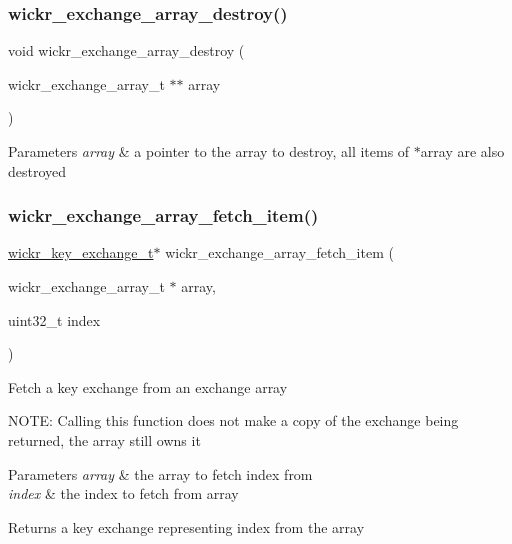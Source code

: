 \subsubsection{\texorpdfstring{wickr\+\_\+exchange\+\_\+array\+\_\+destroy()}{wickr\_exchange\_array\_destroy()}}
{\footnotesize\ttfamily void wickr\+\_\+exchange\+\_\+array\+\_\+destroy (\begin{DoxyParamCaption}\item[{wickr\+\_\+exchange\+\_\+array\+\_\+t $\ast$$\ast$}]{array }\end{DoxyParamCaption})}


\begin{DoxyParams}{Parameters}
{\em array} & a pointer to the array to destroy, all items of \textquotesingle{}$\ast$array\textquotesingle{} are also destroyed \\
\hline
\end{DoxyParams}
\mbox{\label{group__wickr__protocol_ga333510c3c7eeb8e33f94495de6bb122d}} 
\subsubsection{\texorpdfstring{wickr\+\_\+exchange\+\_\+array\+\_\+fetch\+\_\+item()}{wickr\_exchange\_array\_fetch\_item()}}
{\footnotesize\ttfamily \mbox{\hyperlink{structwickr__key__exchange}{wickr\+\_\+key\+\_\+exchange\+\_\+t}}$\ast$ wickr\+\_\+exchange\+\_\+array\+\_\+fetch\+\_\+item (\begin{DoxyParamCaption}\item[{wickr\+\_\+exchange\+\_\+array\+\_\+t $\ast$}]{array,  }\item[{uint32\+\_\+t}]{index }\end{DoxyParamCaption})}

Fetch a key exchange from an exchange array

N\+O\+TE\+: Calling this function does not make a copy of the exchange being returned, the array still owns it


\begin{DoxyParams}{Parameters}
{\em array} & the array to fetch \textquotesingle{}index\textquotesingle{} from \\
\hline
{\em index} & the index to fetch from \textquotesingle{}array\textquotesingle{} \\
\hline
\end{DoxyParams}
\begin{DoxyReturn}{Returns}
a key exchange representing \textquotesingle{}index\textquotesingle{} from the array 
\end{DoxyReturn}
\mbox{\label{group__wickr__protocol_ga907d700b76b748f80796b4404c7172c2}} 
